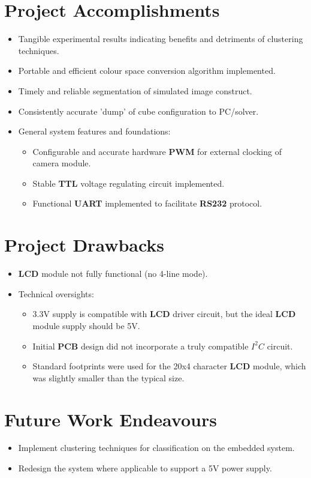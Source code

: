 \documentclass[11pt, a4paper, oneside]{Thesis} %
\begin{document}
\section{Project Accomplishments}
\begin{itemize}
\item Tangible experimental results indicating benefits and detriments of clustering techniques.
\item Portable and efficient colour space conversion algorithm implemented.
\item Timely and reliable segmentation of simulated image construct.
\item Consistently accurate 'dump' of cube configuration to PC/solver. 
\item General system features and foundations:
  \begin{itemize}
    \item Configurable and accurate hardware \textbf{PWM} for external clocking of camera module.
    \item Stable \textbf{TTL} voltage regulating circuit implemented.
    \item Functional \textbf{UART} implemented to facilitate \textbf{RS232} protocol.
  \end{itemize}
\end{itemize}

\section{Project Drawbacks}
\begin{itemize}
\item \textbf{LCD} module not fully functional (no 4-line mode).
\item Technical oversights:
  \begin{itemize}
    \item 3.3V supply is compatible with \textbf{LCD} driver circuit, but the ideal \textbf{LCD} module supply should be 5V.
    \item Initial \textbf{PCB} design did not incorporate a truly compatible $I^2C$ circuit.
    \item Standard footprints were used for the 20x4 character \textbf{LCD} module, which was slightly smaller than the typical size.
  \end{itemize}
\end{itemize}

\section{Future Work Endeavours}
\begin{itemize}
  \item Implement clustering techniques for classification on the embedded system. 
  \item Redesign the system where applicable to support a 5V power supply.
\end{itemize}
\end{document}

